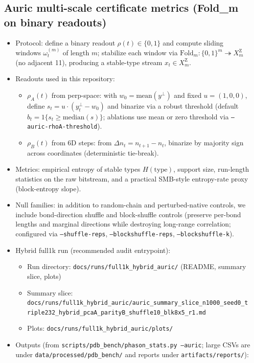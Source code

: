 \subsection*{Auric multi-scale certificate metrics (Fold\_m on binary readouts)}
\begin{itemize}
  \item Protocol: define a binary readout $\rho(t)\in\{0,1\}$ and compute sliding windows $\omega_t^{(m)}$ of length $m$; stabilize each window via $\mathrm{Fold}_m:\{0,1\}^m\twoheadrightarrow X_m^{\mathrm Z}$ (no adjacent 11), producing a stable-type stream $x_t\in X_m^{\mathrm Z}$.
  \item Readouts used in this repository:
  \begin{itemize}
    \item $\rho_A(t)$ from perp-space: with $w_0=\mathrm{mean}(y^\perp)$ and fixed $u=(1,0,0)$, define $s_t=u\cdot(y^\perp_t-w_0)$ and binarize via a robust threshold (default $b_t=1\{s_t\ge \mathrm{median}(s)\}$; ablations use mean or zero threshold via \texttt{--auric-rhoA-threshold}).
    \item $\rho_B(t)$ from 6D steps: from $\Delta n_t=n_{t+1}-n_t$, binarize by majority sign across coordinates (deterministic tie-break).
  \end{itemize}
  \item Metrics: empirical entropy of stable types $H(\mathrm{type})$, support size, run-length statistics on the raw bitstream, and a practical SMB-style entropy-rate proxy (block-entropy slope).
  \item Null families: in addition to random-chain and perturbed-native controls, we include bond-direction shuffle and block-shuffle controls (preserve per-bond lengths and marginal directions while destroying long-range correlation; configured via \texttt{--shuffle-reps}, \texttt{--blockshuffle-reps}, \texttt{--blockshuffle-k}).
  \item Hybrid full1k run (recommended audit entrypoint):
  \begin{itemize}
    \item Run directory: \texttt{docs/runs/full1k\_hybrid\_auric/} (README, summary slice, plots)
    \item Summary slice: \texttt{docs/runs/full1k\_hybrid\_auric/auric\_summary\_slice\_n1000\_seed0\_triple232\_hybrid\_pcaA\_parityB\_shuffle10\_blk8x5\_r1.md}
    \item Plots: \texttt{docs/runs/full1k\_hybrid\_auric/plots/}
  \end{itemize}
  \item Outputs (from \texttt{scripts/pdb\_bench/phason\_stats.py --auric}; large CSVs are under \texttt{data/processed/pdb\_bench/} and reports under \texttt{artifacts/reports/}):

\end{itemize}
